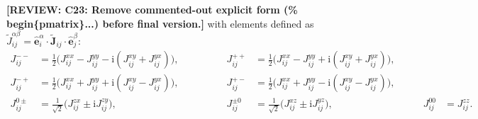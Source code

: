 \documentclass[aps, prx, nofootinbib, superscriptaddress]{revtex4-2}
\newcommand{\REVIEW}[1]{{\color{reviewcolor}\bfseries [REVIEW: #1]}}
\newcommand{\ri}{\mathrm{i}}
\begin{document}
\REVIEW{C23: Remove commented-out explicit form (\% begin\{pmatrix\}...) before final version.}
with elements defined as $\widetilde{J}_{ij}^{\alpha\beta} = \hat{\mathbf{e}}_i^{\alpha} \cdot \widetilde{\mathbf{J}}_{ij} \cdot \hat{\mathbf{e}}_j^{\beta}$:
\begin{equation}\label{eq: expressions for exchange couplings}
    \begin{array}{rlrlrl}
        J_{ij}^{--} &= \frac{1}{2} \big( J_{ij}^{xx} - J_{ij}^{yy} - \ri (J_{ij}^{xy} + J_{ij}^{yx}) \big), \qquad \qquad &
        J_{ij}^{++} &= \frac{1}{2} \big( J_{ij}^{xx} - J_{ij}^{yy} + \ri (J_{ij}^{xy} + J_{ij}^{yx}) \big), &&\\[0.25em]
        J_{ij}^{-+} &= \frac{1}{2} \big( J_{ij}^{xx} + J_{ij}^{yy} + \ri (J_{ij}^{xy} - J_{ij}^{yx}) \big), \qquad &
        J_{ij}^{+-} &= \frac{1}{2} \big( J_{ij}^{xx} + J_{ij}^{yy} - \ri (J_{ij}^{xy} - J_{ij}^{yx}) \big), &&\\[0.25em]
        J_{ij}^{0\pm} &= \frac{1}{\sqrt{2}} \big( J_{ij}^{zx} \pm \ri J_{ij}^{zy} \big), &
        J_{ij}^{\pm0} &= \frac{1}{\sqrt{2}} \big( J_{ij}^{xz} \pm \ri J_{ij}^{yz} \big), & \qquad
        J_{ij}^{00} &= J_{ij}^{zz}.
    \end{array}
\end{equation}
\end{document}
